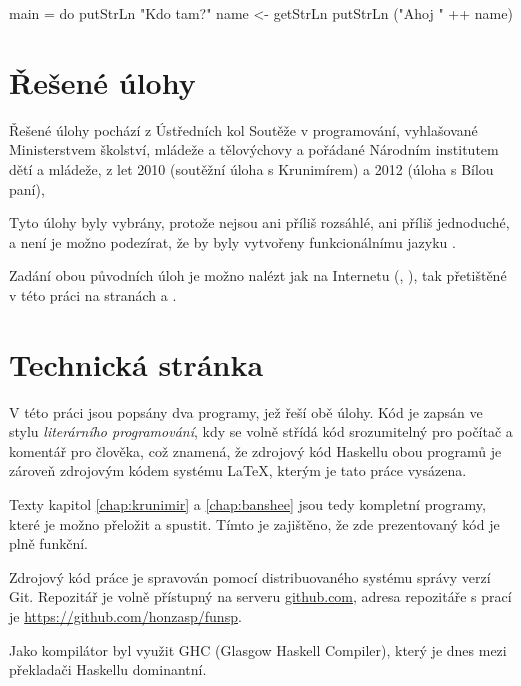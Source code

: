 \begin{haskell}
main = do
  putStrLn "Kdo tam?"
  name <- getStrLn
  putStrLn ("Ahoj " ++ name)
\end{haskell}

\section{Řešené úlohy}

Řešené úlohy pochází z Ústředních kol Soutěže v programování, vyhlašované
Ministerstvem školství, mládeže a tělovýchovy a pořádané Národním institutem
dětí a mládeže, z let 2010 (soutěžní úloha s Krunimírem) a 2012 (úloha s Bílou
paní),

Tyto úlohy byly vybrány, protože nejsou ani příliš rozsáhlé, ani příliš
jednoduché, a není je možno podezírat, že by byly vytvořeny funkcionálnímu jazyku
.

Zadání obou původních úloh je možno nalézt jak na Internetu
(\cite{krunimir-task}, \cite{banshee-task}), tak přetištěné v této práci na
stranách \pageref{pdf:krunimir} a \pageref{pdf:banshee}.

\section{Technická stránka}

V této práci jsou popsány dva programy, jež řeší obě úlohy. Kód je zapsán ve
stylu \emph{literárního programování}, kdy se volně střídá kód srozumitelný pro
počítač a komentář pro člověka, což znamená, že zdrojový kód Haskellu obou
programů je zároveň zdrojovým kódem systému \LaTeX, kterým je tato práce
vysázena.

Texty kapitol \ref{chap:krunimir} a \ref{chap:banshee} jsou tedy kompletní
programy, které je možno přeložit a spustit. Tímto je zajištěno, že zde
prezentovaný kód je plně funkční.

Zdrojový kód práce je spravován pomocí distribuovaného systému správy verzí Git.
Repozitář je volně přístupný na serveru \href{http://github.com}{github.com},
adresa repozitáře s prací je \url{https://github.com/honzasp/funsp}.

Jako kompilátor byl využit GHC (Glasgow Haskell Compiler), který je dnes mezi
překladači Haskellu dominantní.
